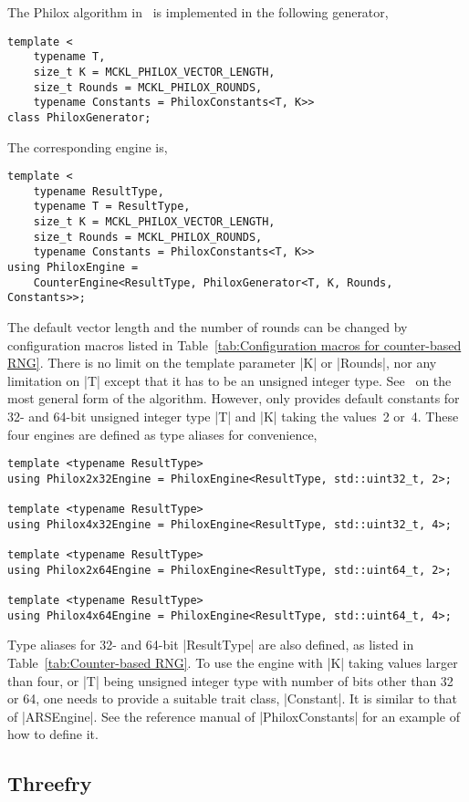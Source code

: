 The Philox algorithm in~\cite{Salmon:2011um} is implemented in the following
generator,
\begin{Verbatim}
template <
    typename T,
    size_t K = MCKL_PHILOX_VECTOR_LENGTH,
    size_t Rounds = MCKL_PHILOX_ROUNDS,
    typename Constants = PhiloxConstants<T, K>>
class PhiloxGenerator;
\end{Verbatim}
The corresponding \rng engine is,
\begin{Verbatim}
template <
    typename ResultType,
    typename T = ResultType,
    size_t K = MCKL_PHILOX_VECTOR_LENGTH,
    size_t Rounds = MCKL_PHILOX_ROUNDS,
    typename Constants = PhiloxConstants<T, K>>
using PhiloxEngine =
    CounterEngine<ResultType, PhiloxGenerator<T, K, Rounds, Constants>>;
\end{Verbatim}
The default vector length and the number of rounds can be changed by
configuration macros listed in Table~\ref{tab:Configuration macros for
counter-based RNG}. There is no limit on the template parameter |K| or
|Rounds|, nor any limitation on |T| except that it has to be an unsigned
integer type. See~\cite{Salmon:2011um} on the most general form of the
algorithm. However, \mckl only provides default constants for 32- and 64-bit
unsigned integer type |T| and |K| taking the values~2 or~4. These four engines
are defined as type aliases for convenience,
\begin{Verbatim}
template <typename ResultType>
using Philox2x32Engine = PhiloxEngine<ResultType, std::uint32_t, 2>;

template <typename ResultType>
using Philox4x32Engine = PhiloxEngine<ResultType, std::uint32_t, 4>;

template <typename ResultType>
using Philox2x64Engine = PhiloxEngine<ResultType, std::uint64_t, 2>;

template <typename ResultType>
using Philox4x64Engine = PhiloxEngine<ResultType, std::uint64_t, 4>;
\end{Verbatim}
Type aliases for 32- and 64-bit |ResultType| are also defined, as listed in
Table~\ref{tab:Counter-based RNG}. To use the engine with |K| taking values
larger than four, or |T| being unsigned integer type with number of bits other
than 32 or 64, one needs to provide a suitable trait class, |Constant|. It is
similar to that of |ARSEngine|. See the reference manual of |PhiloxConstants|
for an example of how to define it.

\subsection{Threefry}
\label{sub:Threefry}

